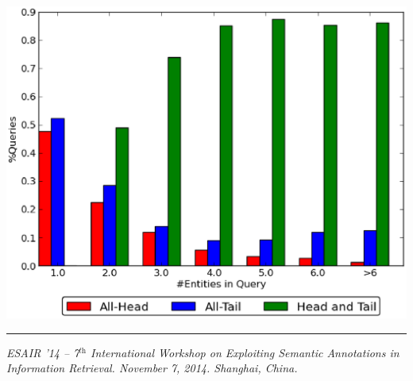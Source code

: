 \documentclass[a0,portrait,final]{a0poster}
\begin{document}
\begin{multicols}{2}
\begin {itemize}
	
		
		\vspace{10mm}
		\begin{center}
		\includegraphics[width=0.5\columnwidth]{img/entity-head-tail-count.eps}
		\label{img:headTailEntPercent}
		\end{center}
\end {itemize}



\end{multicols}
\vfill
\centering
\begin{minipage}[c]{\textwidth}
\rule{\textwidth}{1pt}
\textit{ESAIR '14  -- 7$^\textit{th}$ International Workshop on Exploiting Semantic Annotations in Information Retrieval. November 7, 2014. Shanghai, China.}
\end{minipage}
\end{document}
